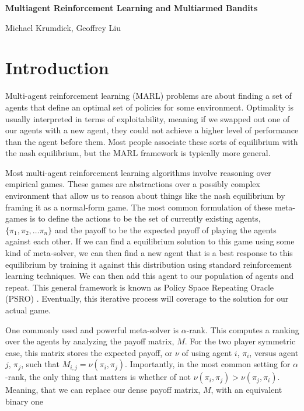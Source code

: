 \documentclass{article}
\begin{document}
\noindent \large\textbf{Multiagent Reinforcement Learning and Multiarmed Bandits}

\noindent \large Michael Krumdick, Geoffrey Liu

\section{Introduction}

Multi-agent reinforcement learning (MARL) problems are about finding a set of
agents that define an optimal set of policies for some environment. Optimality is usually
interpreted in terms of exploitability, meaning if we swapped out one of our
agents with a new agent, they could not achieve a higher level of performance than
the agent before them. Most people associate these sorts of equilibrium with the
nash equilibrium\cite{nash}, but the MARL framework is typically more general.

Most multi-agent reinforcement learning algorithms involve reasoning over
empirical games. These games are abstractions over a possibly complex
environment that allow us to reason about things like the nash equilibrium by
framing it as a normal-form game. The most common formulation of these
meta-games is to define the actions to be the set of currently existing
agents, $\{\pi_1, \pi_2, \dots \pi_n\}$ and the payoff to be the expected payoff
of playing the agents against each other. If we can find a equilibrium solution
to this game using some kind of meta-solver, we can then find a new agent that
is a best response to this equilibrium by training it against this distribution
using standard reinforcement learning techniques. We can then add this agent to
our population of agents and repeat. This general framework is known as Policy
Space Repeating Oracle (PSRO) \cite{PSRO}. Eventually, this iterative process
will coverage to the solution for our actual game.

One commonly used and powerful meta-solver is $\alpha$-rank. \cite{alpha} \cite{alphaPSRO}
This computes a ranking over the agents by analyzing the payoff matrix, $M$.
For the two player symmetric case, this matrix stores the expected payoff, or
$\nu$ of using agent $i$, $\pi_i$, versus agent $j$, $\pi_j$, such
that $M_{i, j} = \nu(\pi_i, \pi_j)$. Importantly, in the most common setting for
$\alpha$-rank, the only thing that matters is whether of not $\nu(\pi_i, \pi_j)
> \nu(\pi_j, \pi_i)$. Meaning, that we can replace our dense payoff matrix, $M$,
with an equivalent binary one 
\end{document}
